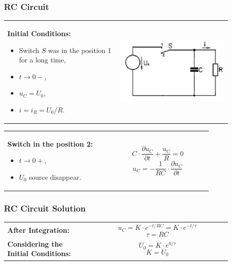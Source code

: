 \documentclass{beamer}
\begin{document}
	\begin{frame}
    \frametitle{RC Circuit}
		\begin{center}
		\begin{tabular}{m{0.45\linewidth} m{0.45\linewidth}}
			\textbf{Initial Conditions: }
			\begin{itemize}
				\item Switch $S$ was in the position 1 for a long time,
				\item $t \longrightarrow 0-$,
				\item $u_C = U_0$,
				\item $i = i_R = U_0/R$.
			\end{itemize}
																					& \includegraphics[scale=0.4]{obr14_obvodRC.png}
		\end{tabular}
		\begin{tabular}{p{0.45\linewidth} p{0.45\linewidth}}
			\textbf{Switch in the position 2: } 
			\begin{itemize}
				\item $t \longrightarrow 0+$,
				\item $U_0$ source disappear.
			\end{itemize}
																					& $$C\cdot \frac{\partial u_C}{\partial t}+\frac{u_C}{R}= 0$$ $$u_C= -\frac{1}{RC}\cdot \frac{\partial u_C}{\partial t}$$
		\end{tabular}
		\end{center}
  \end{frame}
	\begin{frame}
    \frametitle{RC Circuit Solution}
		\begin{center}
		\begin{tabular}{p{0.33\linewidth} p{0.57\linewidth}}
			\textbf{After Integration: } 				& $$u_C = K\cdot e^{-t/RC}= K\cdot e^{-t/\tau}$$ $$\tau = RC$$\\
			\textbf{Considering the Initial Conditions: }
																					& $$U_0 = K\cdot e^{0/\tau}$$ $$K= U_0$$
		\end{tabular}
		\end{center}
  \end{frame}
\end{document}
